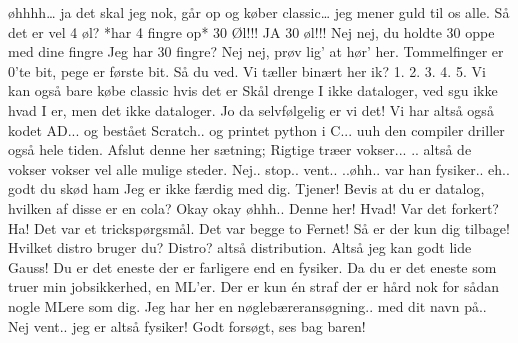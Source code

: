 \documentclass[a4paper,11pt]{article}
\begin{document}
\begin{sketch}
 øhhhh… ja det skal jeg nok, går op og køber classic… jeg mener guld til os alle.
 Så det er vel 4 øl? *har 4 fingre op*
 30 Øl!!!
 JA 30 øl!!!
 Nej nej, du holdte 30 oppe med dine fingre
 Jeg har 30 fingre?
 Nej nej, prøv lig’ at hør’ her. Tommelfinger er 0’te bit, pege er første bit. Så du ved. Vi tæller binært her ik? 1. 2. 3. 4. 5.
 Vi kan også bare købe classic hvis det er
 Skål drenge
 I ikke dataloger, ved sgu ikke hvad I er, men det ikke dataloger. 
 Jo da selvfølgelig er vi det! Vi har altså også kodet AD... og bestået Scratch.. og printet python i C... uuh den compiler driller også hele tiden.
 Afslut denne her sætning; Rigtige træer vokser...
 .. altså de vokser vokser vel alle mulige steder.
 Nej.. stop.. vent.. ..øhh.. var han fysiker.. eh.. godt du skød ham
 Jeg er ikke færdig med dig. Tjener!
 Bevis at du er datalog, hvilken af disse er en cola?
 Okay okay
 øhhh.. Denne her!
 Hvad! Var det forkert?
 Ha! Det var et trickspørgsmål. Det var begge to Fernet!
 Så er der kun dig tilbage! Hvilket distro bruger du?
 Distro? altså distribution. Altså jeg kan godt lide Gauss!
 Du er det eneste der er farligere end en fysiker. Da du er det eneste som truer min jobsikkerhed, en ML'er. Der er kun én straf der er hård nok for sådan nogle MLere som dig. Jeg har her en nøglebæreransøgning.. med dit navn på..
 Nej vent.. jeg er altså fysiker!
 Godt forsøgt, ses bag baren!
\end{sketch}
\end{document}

